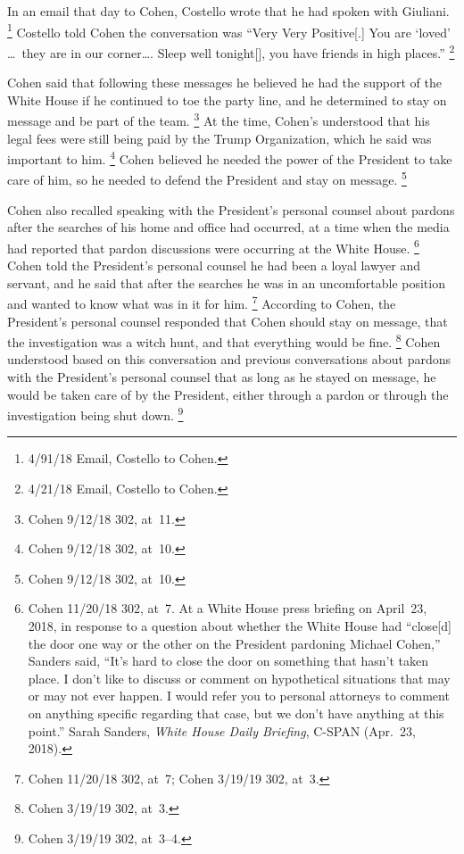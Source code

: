 In an email that day to Cohen, Costello wrote that he had spoken with Giuliani.%
\footnote{4/91/18 Email, Costello to Cohen.}
Costello told Cohen the conversation was ``Very Very Positive[.] You are `loved' \dots\ they are in our corner\dots. Sleep well tonight[], you have friends in high places.''%
\footnote{4/21/18 Email, Costello to Cohen. }

Cohen said that following these messages he believed he had the support of the White House if he continued to toe the party line, and he determined to stay on message and be part of the team.%
\footnote{Cohen 9/12/18 302, at~11.}
At the time, Cohen's understood that his legal fees were still being paid by the Trump Organization, which he said was important to him.%
\footnote{Cohen 9/12/18 302, at~10.}
Cohen believed he needed the power of the President to take care of him, so he needed to defend the President and stay on message.%
\footnote{Cohen 9/12/18 302, at~10.}

Cohen also recalled speaking with the President's personal counsel about pardons after the searches of his home and office had occurred, at a time when the media had reported that pardon discussions were occurring at the White House.%
\footnote{Cohen 11/20/18 302, at~7.
At a White House press briefing on April~23, 2018, in response to a question about whether the White House had ``close[d] the door one way or the other on the President pardoning Michael Cohen,'' Sanders said, ``It's hard to close the door on something that hasn't taken place.
I don't like to discuss or comment on hypothetical situations that may or may not ever happen.
I would refer you to personal attorneys to comment on anything specific regarding that case, but we don't have anything at this point.''
Sarah Sanders, \textit{White House Daily Briefing}, C-SPAN (Apr.~23, 2018).}
Cohen told the President's personal counsel he had been a loyal lawyer and servant, and he said that after the searches he was in an uncomfortable position and wanted to know what was in it for him.%
\footnote{Cohen 11/20/18 302, at~7;
Cohen 3/19/19 302, at~3.}
According to Cohen, the President's personal counsel responded that Cohen should stay on message, that the investigation was a witch hunt, and that everything would be fine.%
\footnote{Cohen 3/19/19 302, at~3.}
Cohen understood based on this conversation and previous conversations about pardons with the President's personal counsel that as long as he stayed on message, he would be taken care of by the President, either through a pardon or through the investigation being shut down.%
\footnote{Cohen 3/19/19 302, at~3--4.}

